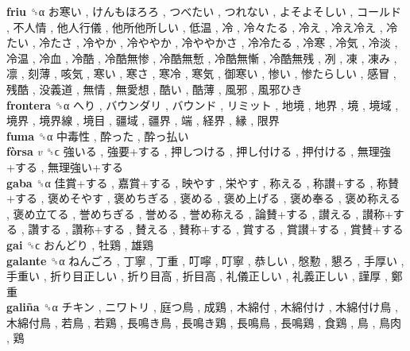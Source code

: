 \textbf{friu} ␝α   お寒い ,  けんもほろろ ,  つべたい ,  つれない ,  よそよそしい ,  コールド ,  不人情 ,  他人行儀 ,  他所他所しい ,  低温 ,  冷 ,  冷々たる ,  冷え ,  冷え冷え ,  冷たい ,  冷たさ ,  冷やか ,  冷ややか ,  冷ややかさ ,  冷冷たる ,  冷寒 ,  冷気 ,  冷淡 ,  冷温 ,  冷血 ,  冷酷 ,  冷酷無惨 ,  冷酷無慙 ,  冷酷無慚 ,  冷酷無残 ,  冽 ,  凍 ,  凍み ,  凛 ,  刻薄 ,  咳気 ,  寒い ,  寒さ ,  寒冷 ,  寒気 ,  御寒い ,  惨い ,  惨たらしい ,  感冒 ,  残酷 ,  没義道 ,  無情 ,  無愛想 ,  酷い ,  酷薄 ,  風邪 ,  風邪ひき   \\
\textbf{frontera} ␝α   へり ,  バウンダリ ,  バウンド ,  リミット ,  地境 ,  地界 ,  境 ,  境域 ,  境界 ,  境界線 ,  境目 ,  疆域 ,  疆界 ,  端 ,  経界 ,  縁 ,  限界   \\
\textbf{fuma} ␝α   中毒性 ,  酔った ,  酔っ払い   \\
\textbf{fòrsa} \emph{v}  ␝ϲ   強いる ,  強要+する ,  押しつける ,  押し付ける ,  押付ける ,  無理強+する ,  無理強い+する   \\
\textbf{gaba} ␝α   佳賞+する ,  嘉賞+する ,  映やす ,  栄やす ,  称える ,  称讃+する ,  称賛+する ,  褒めそやす ,  褒めちぎる ,  褒める ,  褒め上げる ,  褒め奉る ,  褒め称える ,  褒め立てる ,  誉めちぎる ,  誉める ,  誉め称える ,  論賛+する ,  讃える ,  讃称+する ,  讚する ,  讚称+する ,  賛える ,  賛称+する ,  賞する ,  賞讃+する ,  賞賛+する   \\
\textbf{gai} ␝ϲ   おんどり ,  牡鶏 ,  雄鶏   \\
\textbf{galante} ␝α   ねんごろ ,  丁寧 ,  丁重 ,  叮嚀 ,  叮寧 ,  恭しい ,  慇懃 ,  懇ろ ,  手厚い ,  手重い ,  折り目正しい ,  折り目高 ,  折目高 ,  礼儀正しい ,  礼義正しい ,  謹厚 ,  鄭重   \\
\textbf{galiña} ␝α   チキン ,  ニワトリ ,  庭つ鳥 ,  成鶏 ,  木綿付 ,  木綿付け ,  木綿付け鳥 ,  木綿付鳥 ,  若鳥 ,  若鶏 ,  長鳴き鳥 ,  長鳴き鶏 ,  長鳴鳥 ,  長鳴鶏 ,  食鶏 ,  鳥 ,  鳥肉 ,  鶏   \\
